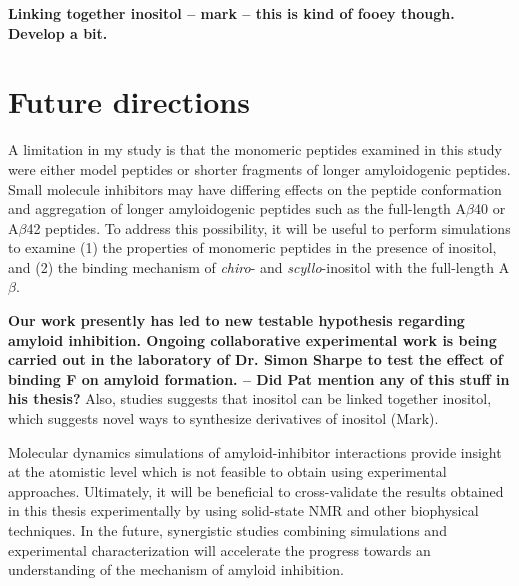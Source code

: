 \textbf{Linking together inositol -- mark -- this is kind of fooey though.  Develop a bit.}

\section{Future directions}

A limitation in my study is that the monomeric peptides examined in this study were either model peptides or shorter fragments of longer amyloidogenic peptides. Small molecule inhibitors may have differing effects on the peptide conformation and aggregation of longer amyloidogenic peptides such as the full-length A$\beta$40 or A$\beta$42 peptides. To address this possibility, it will be useful to perform simulations to examine (1) the properties of monomeric peptides in the presence of inositol, and (2) the binding mechanism of \textit{chiro}- and \textit{scyllo}-inositol with the full-length A$\beta$.

\textbf{Our work presently has led to new testable hypothesis regarding amyloid inhibition. Ongoing collaborative experimental work is being carried out in the laboratory of Dr. Simon Sharpe to test the effect of binding F on amyloid formation. -- Did Pat mention any of this stuff in his thesis?} Also, studies suggests that inositol can be linked together inositol, which suggests novel ways to synthesize derivatives of inositol (Mark).

Molecular dynamics simulations of amyloid-inhibitor interactions provide insight at the atomistic level which is not feasible to obtain using experimental approaches.  Ultimately, it will be beneficial to cross-validate the results obtained in this thesis experimentally by using solid-state NMR and other biophysical techniques. In the future, synergistic studies combining simulations and experimental characterization will accelerate the progress towards an understanding of the mechanism of amyloid inhibition.   
 

